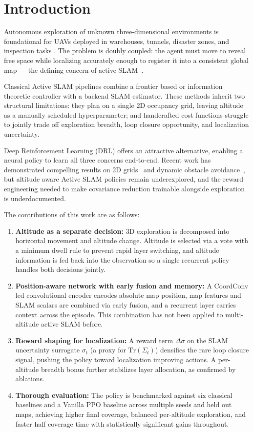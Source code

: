 \documentclass[conference]{IEEEtran}
\begin{document}
\section{Introduction}

Autonomous exploration of unknown three-dimensional environments is foundational for UAVs deployed in warehouses, tunnels, disaster zones, and inspection tasks \cite{qin2019autonomous, zhang2026adaptive}. The problem is doubly coupled: the agent must move to reveal free space while localizing accurately enough to register it into a consistent global map --- the defining concern of active SLAM~\cite{placed2023survey, zhang2026u}.

Classical Active SLAM pipelines combine a frontier based or information theoretic controller with a backend SLAM estimator. These methods inherit two structural limitations: they plan on a single 2D occupancy grid, leaving altitude as a manually scheduled hyperparameter; and handcrafted cost functions struggle to jointly trade off exploration breadth, loop closure opportunity, and localization uncertainty.

Deep Reinforcement Learning (DRL) offers an attractive alternative, enabling a neural policy to learn all three concerns end-to-end. Recent work has demonstrated compelling results on 2D grids~\cite{yin2025maslam, chen2024lidar, zhao2024ddpg} and dynamic obstacle avoidance~\cite{xu2025navrl}, but altitude aware Active SLAM policies remain underexplored, and the reward engineering needed to make covariance reduction trainable alongside exploration is underdocumented.

The contributions of this work are as follows:
\begin{enumerate}
    \item \textbf{Altitude as a separate decision:} 3D exploration is decomposed into horizontal movement and altitude change. Altitude is selected via a vote with a minimum dwell rule to prevent rapid layer switching, and altitude information is fed back into the observation so a single recurrent policy handles both decisions jointly.
    \item \textbf{Position-aware network with early fusion and memory:} A CoordConv led convolutional encoder encodes absolute map position, map features and SLAM scalars are combined via early fusion, and a recurrent layer carries context across the episode. This combination has not been applied to multi-altitude active SLAM before.
    \item \textbf{Reward shaping for localization:} A reward term $\Delta\sigma$ on the SLAM uncertainty surrogate $\sigma_t$ (a proxy for $\mathrm{Tr}(\Sigma_t)$) densifies the rare loop closure signal, pushing the policy toward localization improving actions. A per-altitude breadth bonus further stabilizes layer allocation, as confirmed by ablations.
    \item \textbf{Thorough evaluation:} The policy is benchmarked against six classical baselines and a Vanilla PPO baseline across multiple seeds and held out maps, achieving higher final coverage, balanced per-altitude exploration, and faster half coverage time with statistically significant gains throughout.
\end{enumerate}
\end{document}
